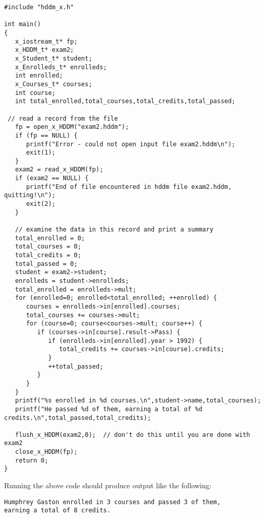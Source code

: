 \documentclass{revtex4}
\begin{document}
\vspace{0.5cm}
\begin{minipage}{12cm}
\begin{verbatim}
#include "hddm_x.h"

int main()
{
   x_iostream_t* fp;
   x_HDDM_t* exam2;
   x_Student_t* student;
   x_Enrolleds_t* enrolleds;
   int enrolled;
   x_Courses_t* courses;
   int course;
   int total_enrolled,total_courses,total_credits,total_passed;

 // read a record from the file
   fp = open_x_HDDM("exam2.hddm");
   if (fp == NULL) {
      printf("Error - could not open input file exam2.hddm\n");
      exit(1);
   }
   exam2 = read_x_HDDM(fp);
   if (exam2 == NULL) {
      printf("End of file encountered in hddm file exam2.hddm, quitting!\n");
      exit(2);
   }

   // examine the data in this record and print a summary
   total_enrolled = 0;
   total_courses = 0;
   total_credits = 0;
   total_passed = 0;
   student = exam2->student;
   enrolleds = student->enrolleds;
   total_enrolled = enrolleds->mult;
   for (enrolled=0; enrolled<total_enrolled; ++enrolled) {
      courses = enrolleds->in[enrolled].courses;
      total_courses += courses->mult;
      for (course=0; course<courses->mult; course++) {
         if (courses->in[course].result->Pass) {
            if (enrolleds->in[enrolled].year > 1992) {
               total_credits += courses->in[course].credits;
            }
            ++total_passed;
         }
      }
   }
   printf("%s enrolled in %d courses.\n",student->name,total_courses);
   printf("He passed %d of them, earning a total of %d credits.\n",total_passed,total_credits);

   flush_x_HDDM(exam2,0);  // don't do this until you are done with exam2
   close_x_HDDM(fp);
   return 0;
}
\end{verbatim}
\end{minipage}
\vspace{0.5cm}

Running the above code should produce output like the following:

\vspace{0.5cm}
\begin{minipage}{12cm}
\begin{verbatim}
Humphrey Gaston enrolled in 3 courses and passed 3 of them,
earning a total of 8 credits.
\end{verbatim}
\end{minipage}
\vspace{0.5cm}
\end{document}
